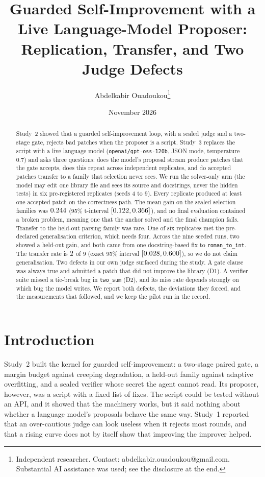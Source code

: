 \documentclass[11pt]{article}
\title{Guarded Self-Improvement with a Live Language-Model Proposer:\\[2pt] Replication, Transfer, and Two Judge Defects}
\author{Abdelkabir Ouadoukou\thanks{Independent researcher. Contact: abdelkabir.ouadoukou@gmail.com.
Substantial AI assistance was used; see the disclosure at the end.}}
\date{November 2026}
\begin{document}
\maketitle
\vspace{-1.2em}

\begin{abstract}
Study~2 showed that a guarded self-improvement loop, with a sealed judge and a two-stage gate, rejects bad patches when the proposer is a script.
Study~3 replaces the script with a live language model (\texttt{openai/gpt-oss-120b}, JSON mode, temperature $0.7$) and asks three questions:
does the model's proposal stream produce patches that the gate accepts, does this repeat across independent replicates, and do accepted patches transfer to a family that selection never sees.
We run the solver-only arm (the model may edit one library file and sees its source and docstrings, never the hidden tests) in six pre-registered replicates (seeds 4 to 9).
Every replicate produced at least one accepted patch on the correctness path. The mean gain on the sealed selection families was $0.244$ (95\% t-interval $[0.122,0.366]$), and no final evaluation contained a broken problem, meaning one that the anchor solved and the final champion fails.
Transfer to the held-out parsing family was rare. One of six replicates met the pre-declared generalisation criterion, which needs four. Across the nine seeded runs, two showed a held-out gain, and both came from one docstring-based fix to \texttt{roman\_to\_int}.
The transfer rate is $2$ of $9$ (exact 95\% interval $[0.028,0.600]$), so we do not claim generalisation.
Two defects in our own judge surfaced during the study. A gate clause was always true and admitted a patch that did not improve the library (D1). A verifier suite missed a tie-break bug in \texttt{two\_sum} (D2), and its miss rate depends strongly on which bug the model writes.
We report both defects, the deviations they forced, and the measurements that followed, and we keep the pilot run in the record.
\end{abstract}

\section{Introduction}

Study~2 \citep{ouadoukou2026study2} built the kernel for guarded self-improvement: a two-stage paired gate, a margin budget against creeping degradation, a held-out family against adaptive overfitting, and a sealed verifier whose secret the agent cannot read.
Its proposer, however, was a script with a fixed list of fixes. The script could be tested without an API, and it showed that the machinery works, but it said nothing about whether a language model's proposals behave the same way.
Study~1 \citep{ouadoukou2026study1} reported that an over-cautious judge can look useless when it rejects most rounds, and that a rising curve does not by itself show that improving the improver helped.
\end{document}
